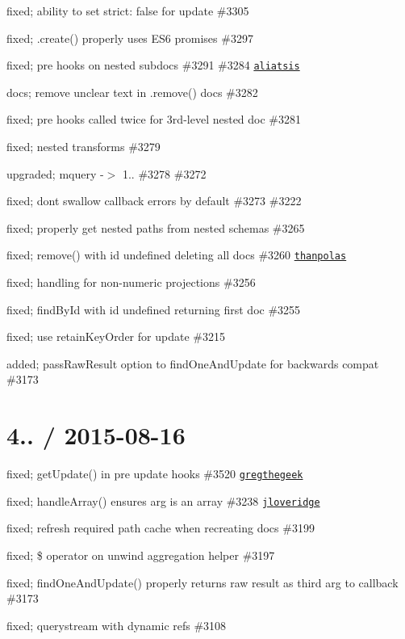 \begin{DoxyItemize}
\item fixed; ability to set strict\+: false for update \#3305
\item fixed; .create() properly uses E\+S6 promises \#3297
\item fixed; pre hooks on nested subdocs \#3291 \#3284 \href{https://github.com/aliatsis}{\tt aliatsis}
\item docs; remove unclear text in .remove() docs \#3282
\item fixed; pre hooks called twice for 3rd-\/level nested doc \#3281
\item fixed; nested transforms \#3279
\item upgraded; mquery -\/$>$ 1.. \#3278 \#3272
\item fixed; don\textquotesingle{}t swallow callback errors by default \#3273 \#3222
\item fixed; properly get nested paths from nested schemas \#3265
\item fixed; remove() with id undefined deleting all docs \#3260 \href{https://github.com/thanpolas}{\tt thanpolas}
\item fixed; handling for non-\/numeric projections \#3256
\item fixed; find\+By\+Id with id undefined returning first doc \#3255
\item fixed; use retain\+Key\+Order for update \#3215
\item added; pass\+Raw\+Result option to find\+One\+And\+Update for backwards compat \#3173
\end{DoxyItemize}

\section*{4.. / 2015-\/08-\/16 }


\begin{DoxyItemize}
\item fixed; get\+Update() in pre update hooks \#3520 \href{https://github.com/gregthegeek}{\tt gregthegeek}
\item fixed; handle\+Array() ensures arg is an array \#3238 \href{https://github.com/jloveridge}{\tt jloveridge}
\item fixed; refresh required path cache when recreating docs \#3199
\item fixed; \$ operator on unwind aggregation helper \#3197
\item fixed; find\+One\+And\+Update() properly returns raw result as third arg to callback \#3173
\item fixed; querystream with dynamic refs \#3108
\end{DoxyItemize}

